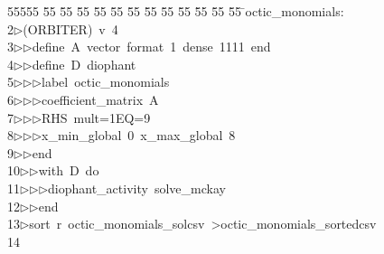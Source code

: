 %
%
\begin{tabbing}
55555 \= 55 \= 55 \= 55 \= 55 \= 55 \= 55 \= 55 \= 55 \= 55 \= 55 \= 55 \= 55 \= \>octic\_monomials:\\[0pt]
2\>$\triangleright$\>(ORBITER)\ v\ 4\ \\[0pt]
3\>$\triangleright$\>$\triangleright$\>define\ A\ vector\ format\ 1\ dense\ 1111\ end\ \\[0pt]
4\>$\triangleright$\>$\triangleright$\>define\ D\ diophant\ \\[0pt]
5\>$\triangleright$\>$\triangleright$\>$\triangleright$\>label\ octic\_monomials\ \\[0pt]
6\>$\triangleright$\>$\triangleright$\>$\triangleright$\>coefficient\_matrix\ A\ \\[0pt]
7\>$\triangleright$\>$\triangleright$\>$\triangleright$\>RHS\ mult=1EQ=9\ \\[0pt]
8\>$\triangleright$\>$\triangleright$\>$\triangleright$\>x\_min\_global\ 0\ x\_max\_global\ 8\ \\[0pt]
9\>$\triangleright$\>$\triangleright$\>end\ \\[0pt]
10\>$\triangleright$\>$\triangleright$\>with\ D\ do\ \\[0pt]
11\>$\triangleright$\>$\triangleright$\>$\triangleright$\>diophant\_activity\ solve\_mckay\ \\[0pt]
12\>$\triangleright$\>$\triangleright$\>end\\[0pt]
13\>$\triangleright$\>sort\ r\ octic\_monomials\_solcsv\ {\textgreater}octic\_monomials\_sortedcsv\\[0pt]
14\>\end{tabbing}
